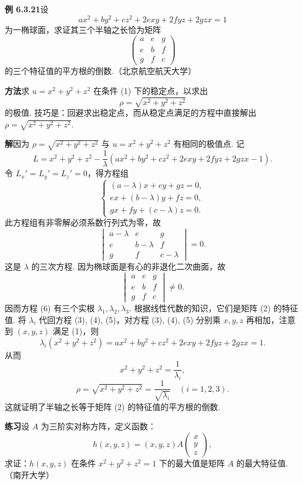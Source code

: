 \documentclass[UTF8, 12pt, fontset=fandol, oneside]{ctexart}
\begin{document}
\noindent\textbf{例 6.3.21}\quad 设
\[
  ax^2+by^2+cz^2+2exy+2fyz+2gzx=1 \tag{1}
\]
为一椭球面，求证其三个半轴之长恰为矩阵
\[
  \begin{pmatrix}
    a&e&g\\
    e&b&f\\
    g&f&c
  \end{pmatrix} \tag{2}
\]
的三个特征值的平方根的倒数.（北京航空航天大学）

\noindent\textbf{方法}\quad 求 $u=x^2+y^2+z^2$ 在条件 (1) 下的稳定点，以求出
\[
  \rho=\sqrt{x^2+y^2+z^2}
\]
的极值. 技巧是：回避求出稳定点，而从稳定点满足的方程中直接解出 $\rho=\sqrt{x^2+y^2+z^2}$.

\noindent\textbf{解}\quad 因为 $\rho=\sqrt{x^2+y^2+z^2}$ 与 $u=x^2+y^2+z^2$ 有相同的极值点. 记
\[
  L=x^2+y^2+z^2-\frac1{\lambda}
  (ax^2+by^2+cz^2+2exy+2fyz+2gzx-1).
\]
令 $L_x'=L_y'=L_z'=0$，得方程组
\[
  \begin{cases}
    (a-\lambda)x+ey+gz=0,\\
    ex+(b-\lambda)y+fz=0,\\
    gx+fy+(c-\lambda)z=0.
  \end{cases} \tag{3--5}
\]
此方程组有非零解必须系数行列式为零，故
\[
  \begin{vmatrix}
    a-\lambda&e&g\\
    e&b-\lambda&f\\
    g&f&c-\lambda
  \end{vmatrix}=0. \tag{6}
\]
这是 $\lambda$ 的三次方程. 因为椭球面是有心的非退化二次曲面，故
\[
  \begin{vmatrix}
    a&e&g\\
    e&b&f\\
    g&f&c
  \end{vmatrix}\ne0.
\]
因而方程 (6) 有三个实根 $\lambda_1,\lambda_2,\lambda_3$. 根据线性代数的知识，它们是矩阵 (2) 的特征值. 将 $\lambda_i$ 代回方程 (3), (4), (5)，对方程 (3), (4), (5) 分别乘 $x,y,z$ 再相加，注意到 $(x,y,z)$ 满足 (1)，则
\[
  \lambda_i(x^2+y^2+z^2)=
  ax^2+by^2+cz^2+2exy+2fyz+2gzx=1.
\]
从而
\[
  x^2+y^2+z^2=\frac1{\lambda_i},
\]
\[
  \rho=\sqrt{x^2+y^2+z^2}=\frac1{\sqrt{\lambda_i}}
  \quad(i=1,2,3).
\]
这就证明了半轴之长等于矩阵 (2) 的特征值的平方根的倒数.

\noindent\textbf{练习}\quad 设 $A$ 为三阶实对称方阵，定义函数：
\[
  h(x,y,z)=(x,y,z)A
  \begin{pmatrix}
    x\\y\\z
  \end{pmatrix},
\]
求证：$h(x,y,z)$ 在条件 $x^2+y^2+z^2=1$ 下的最大值是矩阵 $A$ 的最大特征值.（南开大学）
\end{document}
